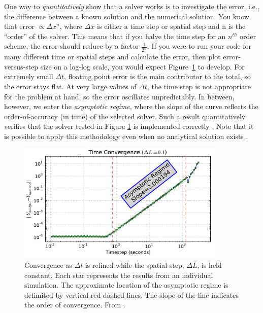\documentclass[12pt, letterpaper]{article}
\begin{document}
One way to \emph{quantitatively} show that a solver works is to investigate
the error, i.e., the difference between a known solution and the numerical
solution.  You know that error $\propto \Delta x^n$, where $\Delta x$ is either
a time step or spatial step and n is the ``order'' of the solver.  
This means that if you halve the time step for an $n^{th}$ order scheme, the 
error should reduce by a factor $\frac{1}{2^n}$.  If you were to run your code 
for many different time or spatial steps and calculate the error, then plot
error-versus-step size on a log-log scale, you would expect Figure~\ref{f1} to
develop.  For extremely small $\Delta t$, floating point error is the main
contributor to the total, so the error stays flat.  At very large values of
$\Delta t$, the time step is not appropriate for the problem at hand, so the
error oscillates unpredictably.  In between, however, we enter the 
\emph{asymptotic regime}, where the slope of the curve reflects the 
order-of-accuracy (in time) of the selected solver.  Such a result
quantitatively verifies that the solver tested in Figure \ref{f1} is 
implemented correctly \cite[e.g.,][]{Roache:1998}.  Note that it is possible
to apply this methodology even when no analytical solution exists
\cite[][]{Roache:2002}.

\begin{figure}[h]
  \vspace*{2mm}
  \begin{center}
    \includegraphics[width=10cm]{fig05_a.pdf}
  \end{center}
  \caption{Convergence as $\Delta t$ is refined while the spatial step, 
    $\Delta L$, is held constant.
    Each star represents the results from an individual simulation.
    The approximate location of the asymptotic regime is delimited by vertical
    red dashed lines.  The slope of the line indicates the order of convergence.
    From \citet{welling_rb}.}
  \label{f1}
\end{figure}
\end{document}
